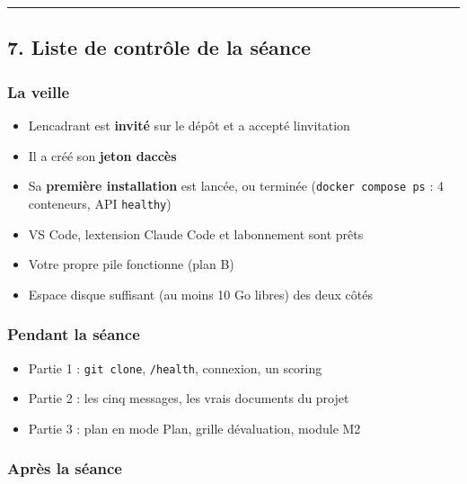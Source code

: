 \documentclass[
  french,
  11pt,
  a4paper,
]{article}
\providecommand{\tightlist}{%
  \setlength{\itemsep}{0pt}\setlength{\parskip}{0pt}}
\begin{document}
\begin{center}\rule{0.5\linewidth}{0.5pt}\end{center}

\subsection{7. Liste de contrôle de la
séance}\label{7-liste-de-contruxf4le-de-la-suxe9ance}

\subsubsection{La veille}\label{la-veille}

\begin{itemize}
\tightlist
\item[$\square$]
  L\textquotesingle encadrant est \textbf{invité} sur le dépôt et a
  accepté l\textquotesingle invitation
\item[$\square$]
  Il a créé son \textbf{jeton d\textquotesingle accès}
\item[$\square$]
  Sa \textbf{première installation} est lancée, ou terminée
  (\texttt{docker\ compose\ ps} : 4 conteneurs, API \texttt{healthy})
\item[$\square$]
  VS Code, l\textquotesingle extension Claude Code et
  l\textquotesingle abonnement sont prêts
\item[$\square$]
  Votre propre pile fonctionne (plan B)
\item[$\square$]
  Espace disque suffisant (au moins 10 Go libres) des deux côtés
\end{itemize}

\subsubsection{Pendant la séance}\label{pendant-la-suxe9ance}

\begin{itemize}
\tightlist
\item[$\square$]
  Partie 1 : \texttt{git\ clone}, \texttt{/health}, connexion, un
  scoring
\item[$\square$]
  Partie 2 : les cinq messages, les vrais documents du projet
\item[$\square$]
  Partie 3 : plan en mode Plan, grille d\textquotesingle évaluation,
  module M2
\end{itemize}

\subsubsection{Après la séance}\label{apruxe8s-la-suxe9ance}
\end{document}
